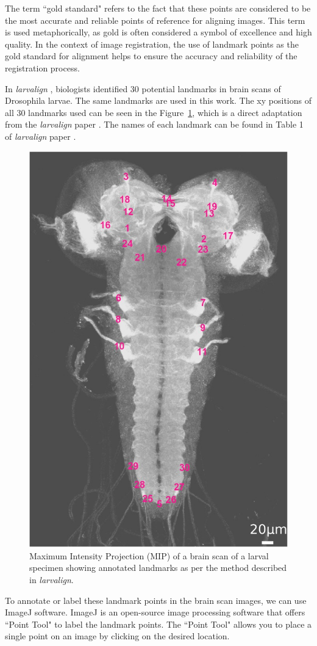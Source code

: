 \documentclass{book}
\begin{document}
	The term ``gold standard" refers to the fact that these points are considered to be the most accurate and reliable points of reference for aligning images. This term is used metaphorically, as gold is often considered a symbol of excellence and high quality. In the context of image registration, the use of landmark points as the gold standard for alignment helps to ensure the accuracy and reliability of the registration process.
	
	In \textit{larvalign} \cite{larvalign}, biologists identified 30 potential landmarks in brain scans of Drosophila larvae. The same landmarks are used in this work. The xy positions of all 30 landmarks used can be seen in the Figure~\ref{fig:landmark_annotations}, which is a direct adaptation from the \emph{larvalign} paper \cite{larvalign}. The names of each landmark can be found in Table 1 of \emph{larvalign} paper \cite{larvalign}.
	
	\begin{figure}[h!]
		\centering
		\includegraphics[width=0.5\columnwidth]{resources/chapter3/landmarks.jpg}
		\caption{Maximum Intensity Projection (MIP) of a brain scan of a larval specimen showing annotated landmarks as per the method described in \textit{larvalign}. \cite{larvalign}}
		\label{fig:landmark_annotations}
	\end{figure}
	
	To annotate or label these landmark points in the brain scan images, we can use ImageJ software. ImageJ is an open-source image processing software that offers ``Point Tool" to label the landmark points. The ``Point Tool" allows you to place a single point on an image by clicking on the desired location.
	
\end{document}
